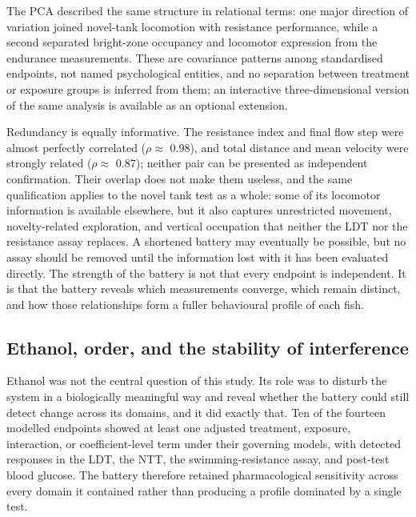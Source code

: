 \documentclass[12pt,a4paper]{article}
\begin{document}
The PCA described the same structure in relational terms: one major direction of variation joined novel-tank locomotion with resistance performance, while a second separated bright-zone occupancy and locomotor expression from the endurance measurements. These are covariance patterns among standardised endpoints, not named psychological entities, and no separation between treatment or exposure groups is inferred from them; an interactive three-dimensional version of the same analysis is available as an optional extension.

Redundancy is equally informative. The resistance index and final flow step were almost perfectly correlated ($\rho \approx$ 0.98), and total distance and mean velocity were strongly related ($\rho \approx$ 0.87); neither pair can be presented as independent confirmation. Their overlap does not make them useless, and the same qualification applies to the novel tank test as a whole: some of its locomotor information is available elsewhere, but it also captures unrestricted movement, novelty-related exploration, and vertical occupation that neither the LDT nor the resistance assay replaces. A shortened battery may eventually be possible, but no assay should be removed until the information lost with it has been evaluated directly. The strength of the battery is not that every endpoint is independent. It is that the battery reveals which measurements converge, which remain distinct, and how those relationships form a fuller behavioural profile of each fish.

\subsection{Ethanol, order, and the stability of interference}

Ethanol was not the central question of this study. Its role was to disturb the system in a biologically meaningful way and reveal whether the battery could still detect change across its domains, and it did exactly that. Ten of the fourteen modelled endpoints showed at least one adjusted treatment, exposure, interaction, or coefficient-level term under their governing models, with detected responses in the LDT, the NTT, the swimming-resistance assay, and post-test blood glucose. The battery therefore retained pharmacological sensitivity across every domain it contained rather than producing a profile dominated by a single test.
\end{document}
